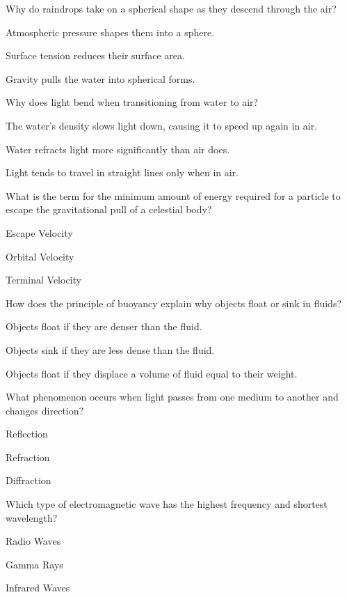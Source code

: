 \begin{enhancedmcq}{Why do raindrops take on a spherical shape as they descend through the air?}
\item Atmospheric pressure shapes them into a sphere.
\item Surface tension reduces their surface area.
\item Gravity pulls the water into spherical forms.

\end{enhancedmcq}
\begin{enhancedmcq}{Why does light bend when transitioning from water to air?}
\item The water's density slows light down, causing it to speed up again in air.
\item Water refracts light more significantly than air does.
\item Light tends to travel in straight lines only when in air.

\end{enhancedmcq}
\begin{enhancedmcq}{What is the term for the minimum amount of energy required for a particle to escape the gravitational pull of a celestial body?}
\item Escape Velocity
\item Orbital Velocity
\item Terminal Velocity

\end{enhancedmcq}
\begin{enhancedmcq}{How does the principle of buoyancy explain why objects float or sink in fluids?}
\item Objects float if they are denser than the fluid.
\item Objects sink if they are less dense than the fluid.
\item Objects float if they displace a volume of fluid equal to their weight.

\end{enhancedmcq}
\begin{enhancedmcq}{What phenomenon occurs when light passes from one medium to another and changes direction?}
\item Reflection
\item Refraction
\item Diffraction

\end{enhancedmcq}
\begin{enhancedmcq}{Which type of electromagnetic wave has the highest frequency and shortest wavelength?}
\item Radio Waves
\item Gamma Rays
\item Infrared Waves

\end{enhancedmcq}
